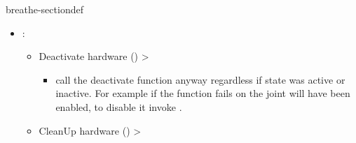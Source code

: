 \documentclass[letterpaper,10pt,english]{sphinxmanual}
\begin{document}
\begin{fulllineitems}
\begin{sphinxuseclass}{breathe-sectiondef}
\begin{fulllineitems}
\begin{itemize}
\item {} 
\sphinxAtStartPar
{}: \begin{itemize}
\item {} 
\sphinxAtStartPar
Deactivate hardware ({\hyperref[\detokenize{code/bioscara_hardware_interfaces/index:classbioscara__hardware__interfaces_1_1BioscaraArmHardwareInterface_1ab126441df1ddd42eee72667dd3d91301}]{}}) \sphinxhyphen{}\textgreater{} \begin{itemize}
\item {} 
\sphinxAtStartPar
call the deactivate function anyway regardless if state was active or inactive. For example if the {\hyperref[\detokenize{code/bioscara_hardware_interfaces/index:classbioscara__hardware__interfaces_1_1BioscaraArmHardwareInterface_1a98236f8d72f1937774358eb326c4e795}]{}} function fails on {\hyperref[\detokenize{code/bioscara_hardware_drivers/index:classbioscara__hardware__drivers_1_1Joint_1a203608e60cc83c2078edf0c3a4a68dbe}]{}} the joint will have been enabled, to disable it invoke {\hyperref[\detokenize{code/bioscara_hardware_interfaces/index:classbioscara__hardware__interfaces_1_1BioscaraArmHardwareInterface_1ab126441df1ddd42eee72667dd3d91301}]{}}.

\end{itemize}


\item {} 
\sphinxAtStartPar
Clean\sphinxhyphen{}Up hardware ({\hyperref[\detokenize{code/bioscara_hardware_interfaces/index:classbioscara__hardware__interfaces_1_1BioscaraArmHardwareInterface_1a1bec98b0fd955e1403ebc224e3562082}]{}}) \sphinxhyphen{}\textgreater{} 

\end{itemize}


\end{itemize}


\end{fulllineitems}
\end{sphinxuseclass}
\end{fulllineitems}
\end{document}
